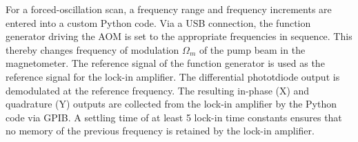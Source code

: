 %
%
%



For a forced-oscillation scan, a frequency range and frequency
increments are entered into a custom Python code. Via a USB
connection, the function generator driving the AOM is set to the
appropriate frequencies in sequence.  This thereby changes frequency
of modulation $\Omega_m$ of the pump beam in the magnetometer.  The
reference signal of the function generator is used as the reference
signal for the lock-in amplifier.  The differential phototdiode output
is demodulated at the reference frequency. The resulting in-phase (X)
and quadrature (Y) outputs are collected from the lock-in amplifier by
the Python code via GPIB.  A settling time of at least 5 lock-in time
constants ensures that no memory of the previous frequency is retained
by the lock-in amplifier.


